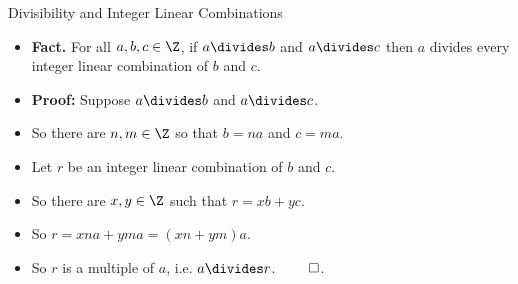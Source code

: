 \documentclass[handout]{beamer}
\begin{document}

\begin{frame}{Divisibility and Integer Linear Combinations}

\begin{itemize}
  \item \textbf{Fact.} For all $a,b,c\in\Z$, if $a\divides b$ and $a\divides c$
  then $a$ divides every integer linear combination of $b$ and $c$.
  \item \textbf{Proof:} Suppose $a\divides b$ and $a\divides c$.
  \item So there are $n,m\in\Z$ so that $b=na$ and $c=ma$.
  \item Let $r$ be an integer linear combination of $b$ and $c$.
  \item So there are $x,y\in\Z$ such that $r=xb+yc$.
  \item So $r=xna + yma = (xn + ym)a$.
  \item So $r$ is a multiple of $a$, i.e. $a\divides r$. $\qed$.
\end{itemize}

\end{frame}
\end{document}

